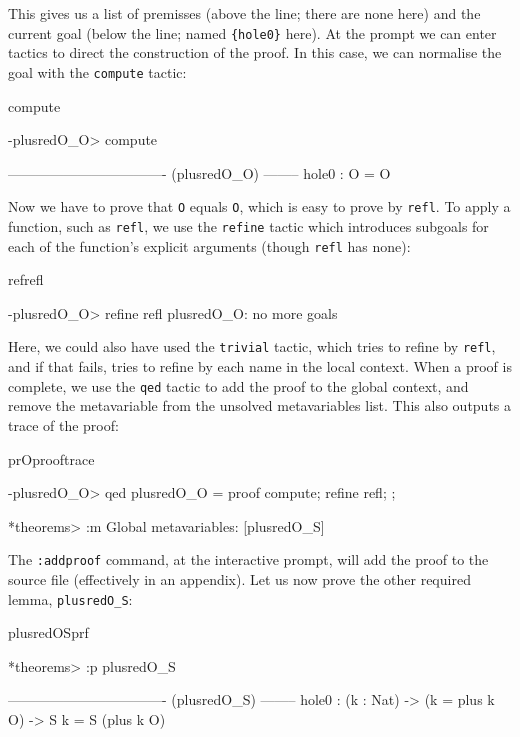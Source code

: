 \noindent
This gives us a list of premisses 
(above the line; there are none here) and the current goal (below the line;
named \texttt{\{hole0\}} here).
At the prompt we can enter tactics to direct the construction of the proof. In this case,
we can normalise the goal with the \texttt{compute} tactic:

\begin{SaveVerbatim}{compute}

-plusredO_O> compute 

---------------------------------- (plusredO_O) --------
{hole0} : O = O

\end{SaveVerbatim}

\noindent
Now we have to prove that \texttt{O} equals \texttt{O}, which is easy to prove by
\texttt{refl}. To apply a function, such as \texttt{refl}, we use the \texttt{refine} tactic
which introduces subgoals for each of the function's explicit arguments (though \texttt{refl}
has none):

\begin{SaveVerbatim}{refrefl}

-plusredO_O> refine refl 
plusredO_O: no more goals

\end{SaveVerbatim}

\noindent
Here, we could also have used the \texttt{trivial} tactic, which tries to refine by
\texttt{refl}, and if that fails, tries to refine by each name in the local context.
When a proof is complete, we use the \texttt{qed} tactic to add the proof to the
global context, and remove the metavariable from the unsolved metavariables list.
This also outputs a trace of the proof:

\begin{SaveVerbatim}{prOprooftrace}

-plusredO_O> qed 
plusredO_O = proof {
    compute;
    refine refl;
};

*theorems> :m 
Global metavariables:
        [plusredO_S]

\end{SaveVerbatim}

\noindent
The \texttt{:addproof} command, at the interactive prompt, will add the proof to
the source file (effectively in an appendix).
Let us now prove the other required lemma, \texttt{plusredO\_S}:

\begin{SaveVerbatim}{plusredOSprf}

*theorems> :p plusredO_S 

---------------------------------- (plusredO_S) --------
{hole0} : (k : Nat) -> (k = plus k O) -> S k = S (plus k O)

\end{SaveVerbatim}


